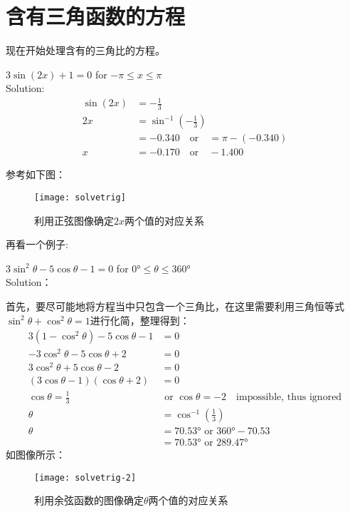 \section{含有三角函数的方程}
\label{sec:Equation with Trig}
现在开始处理含有的三角比的方程。
\begin{ExampleBox}
$3\sin(2x)+1 =0$ for $-\pi\le x\le \pi$\\

Solution:
\begin{align*}
\sin (2x) &= -\frac{1}{3}\\
		2x &=\sin^{-1}\left(-\frac{1}{3}\right)\\
		   &=-0.340 \quad \text{or} \quad  =\pi-(-0.340)\\
 		x  &= -0.170 \quad \text{or} \quad -1.400
\end{align*}

参考如下图：
\begin{figure}[H]
\centering
\texttt{[image: solvetrig]}
\caption{利用正弦图像确定$2x$两个值的对应关系}
\end{figure}
\end{ExampleBox}

再看一个例子:
\begin{ExampleBox}
$3 \sin^2\theta - 5 \cos\theta - 1 = 0$ for $0\si{\degree}\le \theta\le 360\si{\degree}$\\
\tcblower
Solution：

首先，要尽可能地将方程当中只包含一个三角比，在这里需要利用三角恒等式$\sin^2\theta +\cos^2\theta =1$进行化简，整理得到：
\begin{align*}
3(1-\cos^2\theta) -5\cos\theta -1 &= 0\\
-3\cos^2\theta -5\cos\theta +2 &=0\\
3\cos^2\theta +5\cos\theta -2 &=0\\
(3\cos\theta -1)(\cos\theta +2) &=0\\
\cos \theta =\frac{1}{3} &\text{ or } \cos \theta =-2 \quad \text{impossible, thus ignored}\\
\theta &=\cos^{-1}(\frac{1}{3})\\
\theta &=70.53\si{\degree} \text{ or } 360\si{\degree}-70.53\\
		&=70.53\si{\degree} \text{ or }  289.47\si{\degree}
\end{align*}
如图像所示：
\begin{figure}[H]
\centering
\texttt{[image: solvetrig-2]}
\caption{利用余弦函数的图像确定$\theta$两个值的对应关系}
\end{figure}
\end{ExampleBox}

